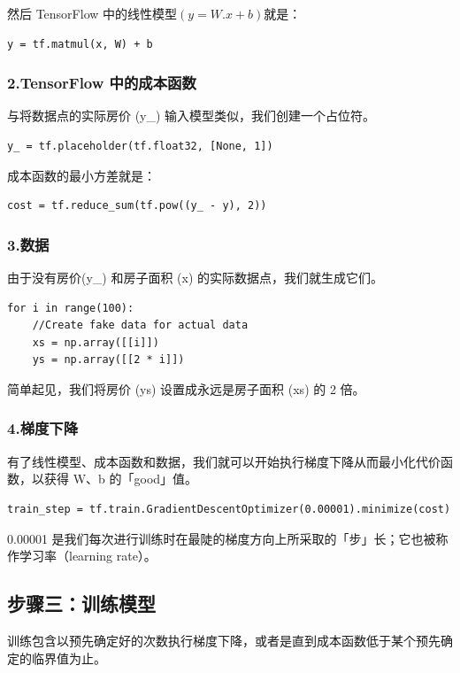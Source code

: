 \documentclass[11pt]{book} %
\begin{document}
然后 TensorFlow 中的线性模型$  (y = W.x + b)  $就是：

\begin{verbatim}
y = tf.matmul(x, W) + b
\end{verbatim}


\subsubsection{2.TensorFlow 中的成本函数}
与将数据点的实际房价 (y\_) 输入模型类似，我们创建一个占位符。

\begin{verbatim}
y_ = tf.placeholder(tf.float32, [None, 1])
\end{verbatim}

成本函数的最小方差就是：

\begin{verbatim}
cost = tf.reduce_sum(tf.pow((y_ - y), 2))
\end{verbatim}

\subsubsection{3.数据}
由于没有房价(y\_) 和房子面积 (x) 的实际数据点，我们就生成它们。

\begin{verbatim}
for i in range(100):
    //Create fake data for actual data
    xs = np.array([[i]])
    ys = np.array([[2 * i]])
\end{verbatim}

简单起见，我们将房价 (ys) 设置成永远是房子面积 (xs) 的 2 倍。

\subsubsection{4.梯度下降}
有了线性模型、成本函数和数据，我们就可以开始执行梯度下降从而最小化代价函数，以获得 W、b 的「good」值。

\begin{verbatim}
train_step = tf.train.GradientDescentOptimizer(0.00001).minimize(cost)
\end{verbatim}

0.00001 是我们每次进行训练时在最陡的梯度方向上所采取的「步」长；它也被称作学习率（learning rate）。

\subsection{步骤三：训练模型}
训练包含以预先确定好的次数执行梯度下降，或者是直到成本函数低于某个预先确定的临界值为止。
\end{document}
